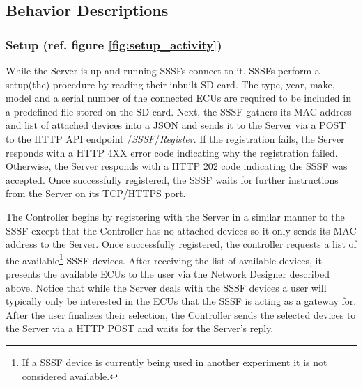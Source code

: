 \documentclass[letterpaper,twocolumn,10pt]{article}
\begin{document}
\subsection{Behavior Descriptions}
\subsubsection{Setup (ref. figure \ref{fig:setup_activity})}
While the Server is up and running SSSFs connect to it. SSSFs perform a setup(the) procedure by reading their inbuilt SD card. The type, year, make, model and a serial number of the connected ECUs are required to be included in a predefined file stored on the SD card. Next, the SSSF gathers its MAC address and list of attached devices into a JSON and sends it to the Server via a POST to the HTTP API endpoint /\textit{SSSF}/\textit{Register}. 
If the registration fails, the Server responds with a HTTP 4XX error code indicating why the registration failed. Otherwise, the Server responds with a HTTP 202 code indicating the SSSF was accepted. Once successfully registered, the SSSF waits for further instructions from the Server on its TCP/HTTPS port. 

The Controller begins by registering with the Server in a similar manner to the SSSF except that the Controller has no attached devices so it only sends its MAC address to the Server.
Once successfully registered, the controller requests a list of the available{\footnote{If a SSSF device is currently being used in another experiment it is not considered available.}} SSSF devices. After receiving the list of available devices, it presents the available ECUs to the user via the Network Designer described above. Notice that while the Server deals with the SSSF devices a user will typically only be interested in the ECUs that the SSSF is acting as a gateway for. After the user finalizes their selection, the Controller sends the selected devices to the Server via a HTTP POST and waits for the Server's reply.
\end{document}
